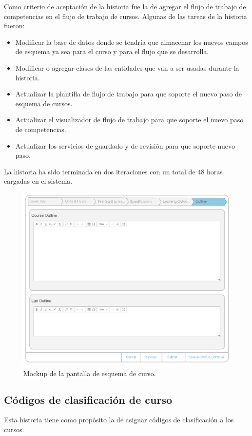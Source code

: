 Como criterio de aceptación de la historia fue la de agregar el flujo de trabajo de competencias en el flujo de trabajo de cursos. Algunas de las tareas de la historia fueron:
\begin{itemize}
	\item Modificar la base de datos donde se tendría que almacenar los nuevos campos de esquema ya sea para el curso y para el flujo que se desarrolla.
	\item Modificar o agregar clases de las entidades que van a ser usadas durante la historia.
	\item Actualizar la plantilla de flujo de trabajo para que soporte el nuevo paso de esquema de cursos.
	\item Actualizar el visualizador de flujo de trabajo para que soporte el nuevo paso de competencias.
	\item Actualizar los servicios de guardado y de revisión para que soporte nuevo paso.
\end{itemize}

La historia ha sido terminada en dos iteraciones con un total de 48 horas cargadas en el sistema.

\begin{figure}[H]
\centering
\includegraphics[scale=0.3]{Capitulos/DesarrollodelaAplicacion/Imagenes/course_outline}
\caption{Mockup de la pantalla de esquema de curso.}
  \label{course_outline}
\end{figure}

\subsection{Códigos de clasificación de curso}
Esta historia tiene como propósito la de asignar códigos de clasificación a los cursos.

